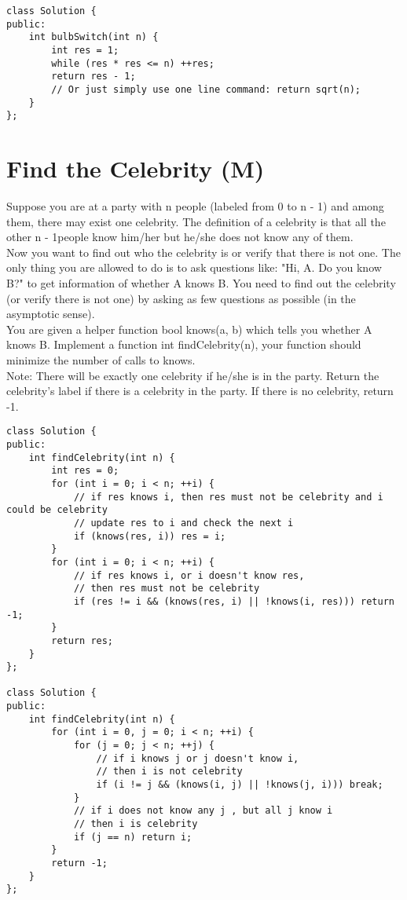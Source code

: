 \begin{lstlisting}
class Solution {
public:
    int bulbSwitch(int n) {
        int res = 1;
        while (res * res <= n) ++res;
        return res - 1;
        // Or just simply use one line command: return sqrt(n);
    }
};
\end{lstlisting}


\section{Find the Celebrity (M)}
Suppose you are at a party with n people (labeled from 0 to n - 1) and among them, there may exist one celebrity. The definition of a celebrity is that all the other n - 1people know him/her but he/she does not know any of them.\\

Now you want to find out who the celebrity is or verify that there is not one. The only thing you are allowed to do is to ask questions like: "Hi, A. Do you know B?" to get information of whether A knows B. You need to find out the celebrity (or verify there is not one) by asking as few questions as possible (in the asymptotic sense).\\

You are given a helper function bool knows(a, b) which tells you whether A knows B. Implement a function int findCelebrity(n), your function should minimize the number of calls to knows.\\

Note: There will be exactly one celebrity if he/she is in the party. Return the celebrity's label if there is a celebrity in the party. If there is no celebrity, return -1.\\

\begin{lstlisting}
class Solution {
public:
    int findCelebrity(int n) {
        int res = 0;
        for (int i = 0; i < n; ++i) {
            // if res knows i, then res must not be celebrity and i could be celebrity
            // update res to i and check the next i
            if (knows(res, i)) res = i;
        }
        for (int i = 0; i < n; ++i) {
            // if res knows i, or i doesn't know res,
            // then res must not be celebrity
            if (res != i && (knows(res, i) || !knows(i, res))) return -1;
        }
        return res;
    }
};

class Solution {
public:
    int findCelebrity(int n) {
        for (int i = 0, j = 0; i < n; ++i) {
            for (j = 0; j < n; ++j) {
                // if i knows j or j doesn't know i,
                // then i is not celebrity
                if (i != j && (knows(i, j) || !knows(j, i))) break;
            }
            // if i does not know any j , but all j know i
            // then i is celebrity
            if (j == n) return i;
        }
        return -1;
    }
};
\end{lstlisting}


